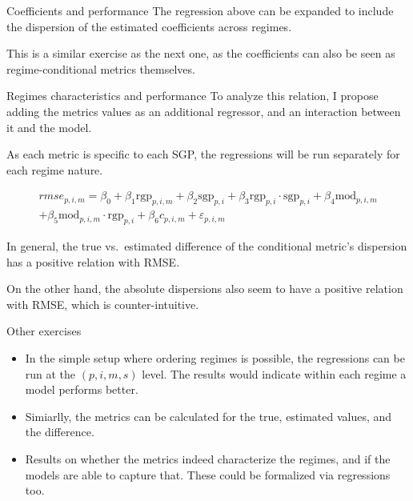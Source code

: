 \documentclass[
  ignorenonframetext,
]{beamer}
\newcommand{\sgp}{\text{sgp}}
\newcommand{\rgp}{\text{rgp}}
\renewcommand{\mod}{\text{mod}}
\begin{document}
\begin{frame}{Coefficients and performance}
\label{coefficients-and-performance}
The regression above can be expanded to include the dispersion of the
estimated coefficients across regimes.

This is a similar exercise as the next one, as the coefficients can also
be seen as regime-conditional metrics themselves.
\end{frame}

\begin{frame}{Regimes characteristics and performance}
\label{regimes-characteristics-and-performance}
To analyze this relation, I propose adding the metrics values as an
additional regressor, and an interaction between it and the model.

As each metric is specific to each SGP, the regressions will be run
separately for each regime nature.

\begin{multline}
    rmse_{p, i, m} = \beta_0 + \beta_1 \rgp_{p, i, m} + \beta_2 \sgp_{p, i} + \beta_3 \rgp_{p, i} \cdot \sgp_{p, i} + \beta_4 \mod_{p, i, m}\\ + \beta_5 \mod_{p, i, m} \cdot \rgp_{p, i} + \beta_6 c_{p, i, m} + \varepsilon_{p, i, m}
\end{multline}

In general, the true vs.~estimated difference of the conditional
metric's dispersion has a positive relation with RMSE.

On the other hand, the absolute dispersions also seem to have a positive
relation with RMSE, which is counter-intuitive.
\end{frame}

\begin{frame}{Other exercises}
\label{other-exercises}
\begin{itemize}
\item
  In the simple setup where ordering regimes is possible, the
  regressions can be run at the \((p, i, m, s)\) level. The results
  would indicate within each regime a model performs better.
\item
  Simiarlly, the metrics can be calculated for the true, estimated
  values, and the difference.
\item
  Results on whether the metrics indeed characterize the regimes, and if
  the models are able to capture that. These could be formalized via
  regressions too.
\end{itemize}
\end{frame}
\end{document}
